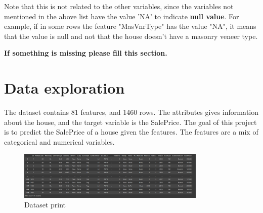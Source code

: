 Note that this is not related to the other variables, since the variables not mentioned in the above list have the value 'NA' to indicate \textbf{null value}. For example, if in some rows the feature "MasVnrType" has the value "NA", it means that the value is null and not that the house doesn't have a masonry veneer type.

\textbf{If something is missing please fill this section.}

\section{Data exploration}
\label{sec:data_exploration}

The dataset contains 81 features, and 1460 rows. The attributes gives information about the house, and the target variable is the SalePrice. The goal of this project is to predict the SalePrice of a house given the features. The features are a mix of categorical and numerical variables.
\begin{figure}[h!]
    \centering
    \includegraphics[width=0.8\textwidth]{imgs/desc1.png}
    \caption{Dataset print}
    \label{fig:dataset_print}
\end{figure}

